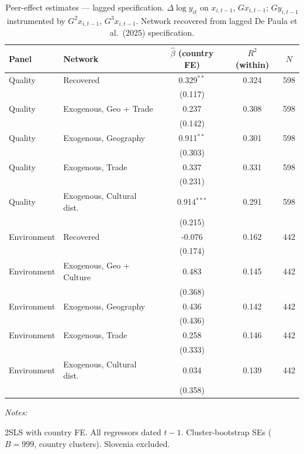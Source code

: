 \documentclass[
  letterpaper,
  DIV=11,
  numbers=noendperiod]{scrartcl}
\begin{document}
\begin{table}[!h]
\centering
\caption{\label{tab:tab:bdf_adjusted_lag}Peer-effect estimates — lagged specification. $\Delta\log y_{it}$ on $x_{i,t-1}$, $Gx_{i,t-1}$; $Gy_{i,t-1}$ instrumented by $G^2x_{i,t-1}$, $G^3x_{i,t-1}$. Network recovered from lagged De Paula et al.\ (2025) specification.}
\centering
\fontsize{9}{11}\selectfont
\begin{threeparttable}
\begin{tabular}[t]{llccc}
\toprule
Panel & Network & $\hat\beta$ (country FE) & $R^2$ (within) & $N$\\
\midrule
Quality & Recovered & 0.329$^{**}$ & 0.324 & 598\\
 &  & (0.117) &  & \\
Quality & Exogenous, Geo + Trade & 0.237 & 0.308 & 598\\
 &  & (0.142) &  & \\
Quality & Exogenous, Geography & 0.911$^{**}$ & 0.301 & 598\\
\addlinespace
 &  & (0.303) &  & \\
Quality & Exogenous, Trade & 0.337 & 0.331 & 598\\
 &  & (0.231) &  & \\
Quality & Exogenous, Cultural dist. & 0.914$^{***}$ & 0.291 & 598\\
 &  & (0.215) &  & \\
\addlinespace
Environment & Recovered & -0.076 & 0.162 & 442\\
 &  & (0.174) &  & \\
Environment & Exogenous, Geo + Culture & 0.483 & 0.145 & 442\\
 &  & (0.368) &  & \\
Environment & Exogenous, Geography & 0.436 & 0.142 & 442\\
\addlinespace
 &  & (0.436) &  & \\
Environment & Exogenous, Trade & 0.258 & 0.146 & 442\\
 &  & (0.333) &  & \\
Environment & Exogenous, Cultural dist. & 0.034 & 0.139 & 442\\
 &  & (0.358) &  & \\
\bottomrule
\end{tabular}
\begin{tablenotes}[para]
\item \textit{Notes:} 
\item 2SLS with country FE. All regressors dated $t-1$. Cluster-bootstrap SEs ($B=999$, country clusters). Slovenia excluded.
\end{tablenotes}
\end{threeparttable}
\end{table}
\end{document}
